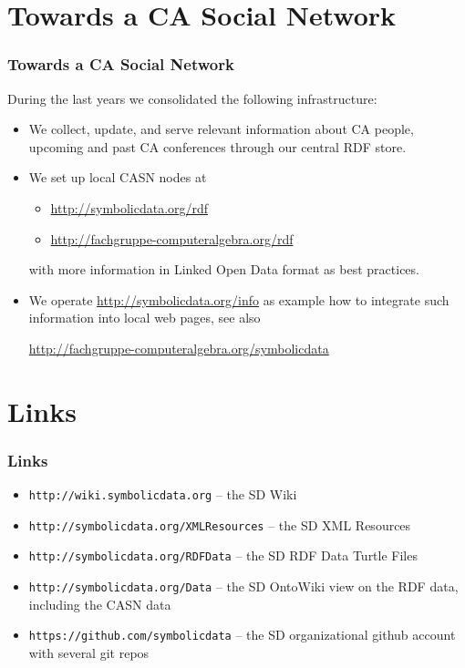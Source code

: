 \documentclass{beamer}
\begin{document}
\section{Towards a CA Social Network}
\begin{frame}\frametitle{Towards a CA Social Network}

During the last years we consolidated the following infrastructure:
\begin{itemize}
\item We collect, update, and serve relevant information about CA people,
  upcoming and past CA conferences through our central RDF store.
\item We set up local CASN nodes at
  \begin{itemize}
  \item \url{http://symbolicdata.org/rdf}
  \item \url{http://fachgruppe-computeralgebra.org/rdf}
  \end{itemize}
  with more information in Linked Open Data format as best practices.
\item We operate \url{http://symbolicdata.org/info} as example how to integrate
  such information into local web pages, see also
  \begin{center}\small
    \url{http://fachgruppe-computeralgebra.org/symbolicdata}
  \end{center}
\end{itemize}

\end{frame}

\section{Links}
\begin{frame}\frametitle{Links}
\begin{itemize}
\item \texttt{http://wiki.symbolicdata.org} -- the SD Wiki
\item \texttt{http://symbolicdata.org/XMLResources} -- the SD XML Resources
\item \texttt{http://symbolicdata.org/RDFData} -- the SD RDF Data Turtle Files
\item \texttt{http://symbolicdata.org/Data} -- the SD OntoWiki view on the
  RDF data, including the CASN data
\item \texttt{https://github.com/symbolicdata} -- the SD organizational github
  account with several git repos
\end{itemize}
\end{frame}
\end{document}

